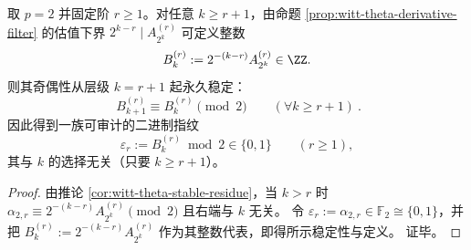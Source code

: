 \begin{corollary}[\texorpdfstring{$p=2$}{p=2} 的稳定奇偶指纹：由 \texorpdfstring{$\theta$}{theta}-导数生成一族无限二进制不变量]\label{cor:witt-theta-binary-fingerprint}
取 \(p=2\) 并固定阶 \(r\ge 1\)。对任意 \(k\ge r+1\)，由命题 \ref{prop:witt-theta-derivative-filter} 的估值下界 \(2^{k-r}\mid A_{2^k}^{(r)}\) 可定义整数
\[
B_k^{(r)}:=2^{-(k-r)}A_{2^k}^{(r)}\in\ZZ.
\]
则其奇偶性从层级 \(k=r+1\) 起永久稳定：
\[
\boxed{\ B_{k+1}^{(r)}\equiv B_{k}^{(r)}\pmod 2\qquad(\forall k\ge r+1)\ }.
\]
因此得到一族可审计的二进制指纹
\[
\varepsilon_r:=B_{k}^{(r)}\bmod 2\in\{0,1\}\qquad(r\ge 1),
\]
其与 \(k\) 的选择无关（只要 \(k\ge r+1\)）。
\end{corollary}
\begin{proof}
由推论 \ref{cor:witt-theta-stable-residue}，当 \(k>r\) 时
\(
\alpha_{2,r}\equiv 2^{-(k-r)}A_{2^k}^{(r)}\pmod 2
\)
且右端与 \(k\) 无关。
令 \(\varepsilon_r:=\alpha_{2,r}\in\mathbb{F}_2\cong\{0,1\}\)，并把
\(
B_k^{(r)}:=2^{-(k-r)}A_{2^k}^{(r)}
\)
作为其整数代表，即得所示稳定性与定义。
证毕。
\end{proof}

